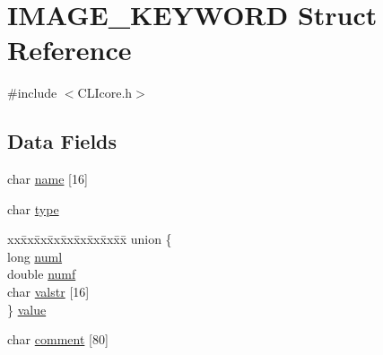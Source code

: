 \hypertarget{structIMAGE__KEYWORD}{\section{I\+M\+A\+G\+E\+\_\+\+K\+E\+Y\+W\+O\+R\+D Struct Reference}
\label{structIMAGE__KEYWORD}
}


{\ttfamily \#include $<$C\+L\+Icore.\+h$>$}

\subsection*{Data Fields}
\begin{DoxyCompactItemize}
\item 
char \hyperlink{structIMAGE__KEYWORD_aa0fef8b5fce4b24d792d0fc01df9dd8a}{name} \mbox{[}16\mbox{]}
\item 
char \hyperlink{structIMAGE__KEYWORD_a93acc5dd5d573d8e91129b27332e4ef4}{type}
\item 
\begin{tabbing}
xx\=xx\=xx\=xx\=xx\=xx\=xx\=xx\=xx\=\kill
union \{\\
\>long \hyperlink{structIMAGE__KEYWORD_a6b685359dddb142ca90215549108055d}{numl}\\
\>double \hyperlink{structIMAGE__KEYWORD_ac90e9ede78d5bc3173c2a0adc0a5b0c5}{numf}\\
\>char \hyperlink{structIMAGE__KEYWORD_a148ed6e2cddc70400b2692efbdd23280}{valstr} \mbox{[}16\mbox{]}\\
\} \hyperlink{structIMAGE__KEYWORD_a93da8b101ca9f8e620803c6e39316b0e}{value}\\

\end{tabbing}\item 
char \hyperlink{structIMAGE__KEYWORD_a3ace85ee9471c3170cf09ba95c5dda07}{comment} \mbox{[}80\mbox{]}
\end{DoxyCompactItemize}


